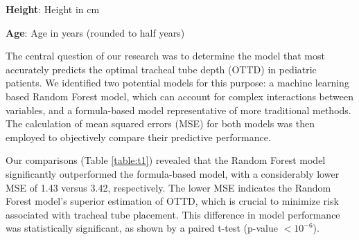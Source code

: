 \documentclass[11pt]{article}
\begin{document}
\begin{table}[h]
\caption{Descriptive statistics of Height and Age stratified by Sex}
\label{table:t0}
\begin{threeparttable}
\renewcommand{\TPTminimum}{\linewidth}
\begin{tablenotes}
\footnotesize
\item \textbf{Height}: Height in cm
\item \textbf{Age}: Age in years (rounded to half years)
\end{tablenotes}
\end{threeparttable}
\end{table}


The central question of our research was to determine the model that most accurately predicts the optimal tracheal tube depth (OTTD) in pediatric patients. We identified two potential models for this purpose: a machine learning based Random Forest model, which can account for complex interactions between variables, and a formula-based model representative of more traditional methods. The calculation of mean squared errors (MSE) for both models was then employed to objectively compare their predictive performance. 

Our comparisons (Table \ref{table:t1}) revealed that the Random Forest model significantly outperformed the formula-based model, with a considerably lower MSE of 1.43 versus 3.42, respectively. The lower MSE indicates the Random Forest model's superior estimation of OTTD, which is crucial to minimize risk associated with tracheal tube placement. This difference in model performance was statistically significant, as shown by a paired t-test (p-value $<$$10^{-6}$). 
\end{document}
